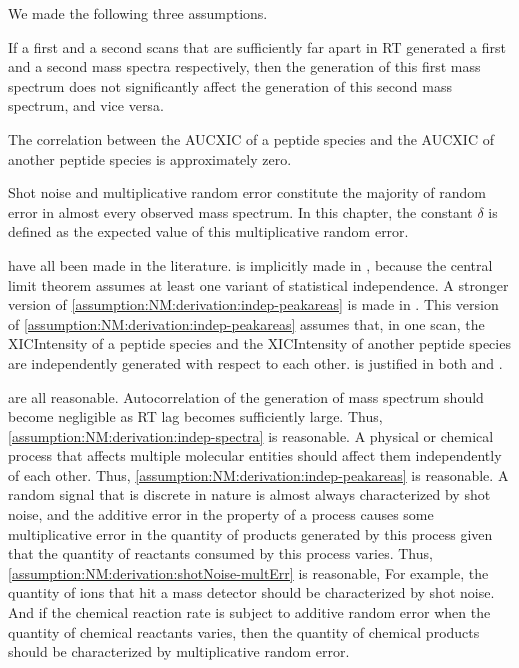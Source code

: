 We made the following three assumptions.
\begin{assumptions}[nolistsep]
\item 
If a first and a second scans that are sufficiently far apart in \gls{RT} generated a first and a second mass spectra respectively,
	then the generation of this first mass spectrum does not significantly affect the generation of this second mass spectrum,
	and vice versa.
\label{assumption:NM:derivation:indep-spectra}
\item 
The correlation between the \gls{AUCXIC} of a peptide species and the \gls{AUCXIC} of another peptide species is approximately zero. 
\label{assumption:NM:derivation:indep-peakareas}
\item
Shot noise and multiplicative random error constitute the majority of random error in almost every observed mass spectrum.
In this chapter, the constant \(\delta\) is defined as the expected value of this multiplicative random error. 
\label{assumption:NM:derivation:shotNoise-multErr}
\end{assumptions}

		have all been made in the literature.
 is implicitly made in \cite{sadygov2006central},
	because the central limit theorem assumes at least one variant of statistical independence.
A stronger version of \cref{assumption:NM:derivation:indep-peakareas} is made in \cite{xu2007mass}.{}
This version of \cref{assumption:NM:derivation:indep-peakareas} assumes that, 
	in one scan, the \gls{XICIntensity} of a peptide species and the \gls{XICIntensity} of another peptide species are independently generated with respect to each other.
 is justified in both \cite{anderle2004quantifying} and \cite{du2008noise}.

 are all reasonable.
Autocorrelation of the generation of mass spectrum should become negligible as \gls{RT} lag becomes sufficiently large.
Thus, \cref{assumption:NM:derivation:indep-spectra} is reasonable.
A physical or chemical process that affects multiple molecular entities should affect them independently of each other.		
Thus, \cref{assumption:NM:derivation:indep-peakareas} is reasonable.
A random signal that is discrete in nature is almost always characterized by shot noise,
	and the additive error in the property of a process causes some multiplicative error in the quantity of products generated by this process given that the quantity of reactants consumed by this process varies.
Thus, \cref{assumption:NM:derivation:shotNoise-multErr} is reasonable,
For example, the quantity of ions that hit a mass detector should be characterized by shot noise.
And if the chemical reaction rate is subject to additive random error when the quantity of chemical reactants varies,
	then the quantity of chemical products should be characterized by multiplicative random error.
		
